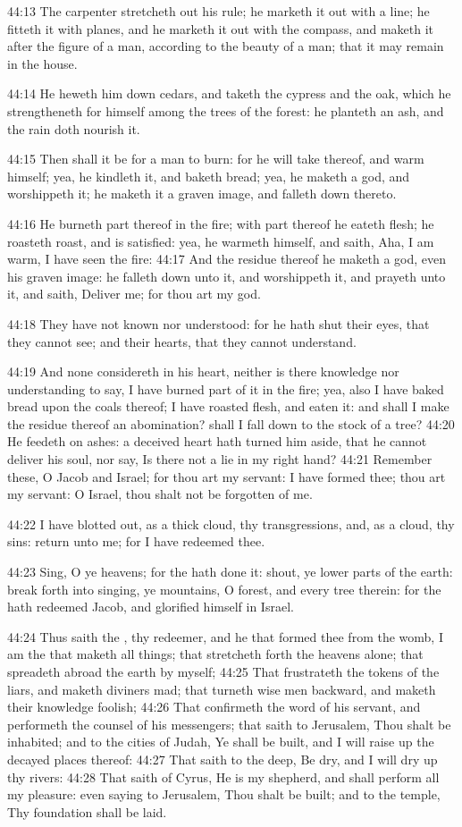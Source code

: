 44:13 The carpenter stretcheth out his rule; he marketh it out with a line; he fitteth it with planes, and he marketh it out with the compass, and maketh it after the figure of a man, according to the beauty of a man; that it may remain in the house.

44:14 He heweth him down cedars, and taketh the cypress and the oak, which he strengtheneth for himself among the trees of the forest: he planteth an ash, and the rain doth nourish it.

44:15 Then shall it be for a man to burn: for he will take thereof, and warm himself; yea, he kindleth it, and baketh bread; yea, he maketh a god, and worshippeth it; he maketh it a graven image, and falleth down thereto.

44:16 He burneth part thereof in the fire; with part thereof he eateth flesh; he roasteth roast, and is satisfied: yea, he warmeth himself, and saith, Aha, I am warm, I have seen the fire: 44:17 And the residue thereof he maketh a god, even his graven image: he falleth down unto it, and worshippeth it, and prayeth unto it, and saith, Deliver me; for thou art my god.

44:18 They have not known nor understood: for he hath shut their eyes, that they cannot see; and their hearts, that they cannot understand.

44:19 And none considereth in his heart, neither is there knowledge nor understanding to say, I have burned part of it in the fire; yea, also I have baked bread upon the coals thereof; I have roasted flesh, and eaten it: and shall I make the residue thereof an abomination?  shall I fall down to the stock of a tree?  44:20 He feedeth on ashes: a deceived heart hath turned him aside, that he cannot deliver his soul, nor say, Is there not a lie in my right hand?  44:21 Remember these, O Jacob and Israel; for thou art my servant: I have formed thee; thou art my servant: O Israel, thou shalt not be forgotten of me.

44:22 I have blotted out, as a thick cloud, thy transgressions, and, as a cloud, thy sins: return unto me; for I have redeemed thee.

44:23 Sing, O ye heavens; for the \LORD hath done it: shout, ye lower parts of the earth: break forth into singing, ye mountains, O forest, and every tree therein: for the \LORD hath redeemed Jacob, and glorified himself in Israel.

44:24 Thus saith the \LORD, thy redeemer, and he that formed thee from the womb, I am the \LORD that maketh all things; that stretcheth forth the heavens alone; that spreadeth abroad the earth by myself; 44:25 That frustrateth the tokens of the liars, and maketh diviners mad; that turneth wise men backward, and maketh their knowledge foolish; 44:26 That confirmeth the word of his servant, and performeth the counsel of his messengers; that saith to Jerusalem, Thou shalt be inhabited; and to the cities of Judah, Ye shall be built, and I will raise up the decayed places thereof: 44:27 That saith to the deep, Be dry, and I will dry up thy rivers: 44:28 That saith of Cyrus, He is my shepherd, and shall perform all my pleasure: even saying to Jerusalem, Thou shalt be built; and to the temple, Thy foundation shall be laid.

